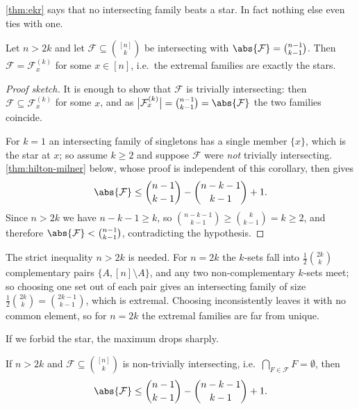 \autoref{thm:ekr} says that no intersecting family beats a star. In fact nothing else even ties with one.

\begin{corollary}\label{cor:ekr-unique}
    Let \(n > 2k\) and let \(\mathcal{F} \subseteq \binom{[n]}{k}\) be intersecting with \(\abs{\mathcal{F}} = \binom{n-1}{k-1}\). Then \(\mathcal{F} = \mathcal{F}_x^{(k)}\) for some \(x \in [n]\), i.e.\ the extremal families are exactly the stars.
\end{corollary}

\begin{proof}[Proof sketch]
    It is enough to show that \(\mathcal{F}\) is trivially intersecting: then \(\mathcal{F} \subseteq \mathcal{F}_x^{(k)}\) for some \(x\), and as \(\bigl\lvert \mathcal{F}_x^{(k)} \bigr\rvert = \binom{n-1}{k-1} = \abs{\mathcal{F}}\) the two families coincide.

    For \(k = 1\) an intersecting family of singletons has a single member \(\{x\}\), which is the star at \(x\); so assume \(k \ge 2\) and suppose \(\mathcal{F}\) were \emph{not} trivially intersecting. \autoref{thm:hilton-milner} below, whose proof is independent of this corollary, then gives
    \[
        \abs{\mathcal{F}} \le \binom{n-1}{k-1} - \binom{n-k-1}{k-1} + 1.
    \]
    Since \(n > 2k\) we have \(n - k - 1 \ge k\), so \(\binom{n-k-1}{k-1} \ge \binom{k}{k-1} = k \ge 2\), and therefore \(\abs{\mathcal{F}} < \binom{n-1}{k-1}\), contradicting the hypothesis.
\end{proof}

\begin{remark}
    The strict inequality \(n > 2k\) is needed. For \(n = 2k\) the \(k\)-sets fall into \(\frac{1}{2}\binom{2k}{k}\) complementary pairs \(\{A, [n] \setminus A\}\), and any two non-complementary \(k\)-sets meet; so choosing one set out of each pair gives an intersecting family of size \(\frac{1}{2}\binom{2k}{k} = \binom{2k-1}{k-1}\), which is extremal. Choosing inconsistently leaves it with no common element, so for \(n = 2k\) the extremal families are far from unique.
\end{remark}

If we forbid the star, the maximum drops sharply.

\begin{theorem}\label{thm:hilton-milner}
    If \(n > 2k\) and \(\mathcal{F} \subseteq \binom{[n]}{k}\) is non-trivially intersecting, i.e.\ \(\bigcap_{F \in \mathcal{F}} F = \emptyset\), then
    \[
        \abs{\mathcal{F}} \le \binom{n-1}{k-1} - \binom{n-k-1}{k-1} + 1.
    \]
\end{theorem}

